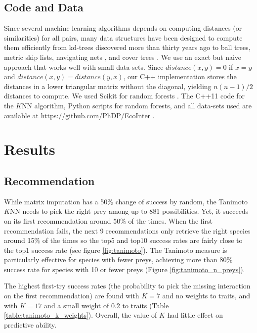 \documentclass[letterpaper]{article}
\begin{document}
\subsection{Code and Data}

Since several machine learning algorithms depends on computing distances (or
similarities) for all pairs, many data structures have been designed to compute
them efficiently from kd-trees discovered more than thirty years ago
\cite{fri77} to ball trees, metric skip lists, navigating nets \cite{izb15},
and cover trees \cite{bey06,izb15}. We use an exact but naive approach that
works well with small data-sets. Since $distance(x, y) = 0$ if $x = y$ and
$distance(x, y) = distance(y, x)$, our C++ implementation stores the distances
in a lower triangular matrix without the diagonal, yielding $n(n - 1)/2$
distances to compute. We used Scikit for random forests \cite{scikit-learn}.
The C++11 code for the $K$NN algorithm, Python scripts for random
forests, and all data-sets used are available at
\href{https://github.com/PhDP/EcoInter}{https://github.com/PhDP/EcoInter}
\cite{phd16b}.



\section{Results}

\subsection{Recommendation}

While matrix imputation has a 50\% change of success by random, the Tanimoto
$K$NN needs to pick the right prey among up to 881 possibilities. Yet, it
succeeds on its first recommendation around 50\% of the times. When the first
recommendation fails, the next 9 recommendations only retrieve the right
species around 15\% of the times so the top5 and top10 success rates are fairly
close to the top1 success rate (see figure \ref{fig:tanimoto}). The Tanimoto
measure is particularly effective for species with fewer preys, achieving more
than 80\% success rate for species with 10 or fewer preys (Figure
\ref{fig:tanimoto_n_preys}).

The highest first-try success rates (the probability to pick the missing
interaction on the first recommendation) are found with $K = 7$ and no weights
to traits, and with $K = 17$ and a small weight of 0.2 to traits (Table
\ref{table:tanimoto_k_weights}). Overall, the value of $K$ had little
effect on predictive ability.
\end{document}
